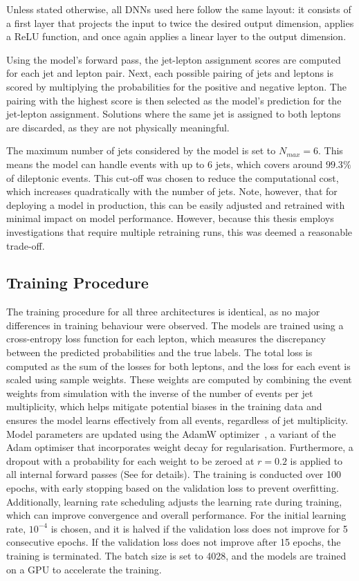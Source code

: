 Unless stated otherwise, all DNNs used here follow the same layout: it consists of a first layer that projects the input to twice the desired output dimension, applies a ReLU function, and once again applies a linear layer to the output dimension.

Using the model's forward pass, the jet-lepton assignment scores are computed for each jet and lepton pair. Next, each possible pairing of jets and leptons is scored by multiplying the probabilities for the positive and negative lepton. The pairing with the highest score is then selected as the model's prediction for the jet-lepton assignment. Solutions where the same jet is assigned to both leptons are discarded, as they are not physically meaningful.

The maximum number of jets considered by the model is set to $N_{max}=6$. This means the model can handle events with up to 6 jets, which covers around $99.3\%$ of dileptonic \ttbar events. This cut-off was chosen to reduce the computational cost, which increases quadratically with the number of jets. Note, however, that for deploying a model in production, this can be easily adjusted and retrained with minimal impact on model performance. However, because this thesis employs investigations that require multiple retraining runs, this was deemed a reasonable trade-off.

\subsection{Training Procedure}
\label{sec:assignment:training-procedure}
The training procedure for all three architectures is identical, as no major differences in training behaviour were observed. The models are trained using a cross-entropy loss function for each lepton, which measures the discrepancy between the predicted probabilities and the true labels. The total loss is computed as the sum of the losses for both leptons, and the loss for each event is scaled using sample weights. These weights are computed by combining the event weights from simulation with the inverse of the number of events per jet multiplicity, which helps mitigate potential biases in the training data and ensures the model learns effectively from all events, regardless of jet multiplicity.
Model parameters are updated using the AdamW optimizer~\cite{adamW}, a variant of the Adam optimiser that incorporates weight decay for regularisation. Furthermore, a dropout with a probability for each weight to be zeroed at $r=0.2$ is applied to all internal forward passes (See  for details). The training is conducted over 100 epochs, with early stopping based on the validation loss to prevent overfitting. Additionally, learning rate scheduling adjusts the learning rate during training, which can improve convergence and overall performance.
For the initial learning rate, $10^{-4}$ is chosen, and it is halved if the validation loss does not improve for 5 consecutive epochs. If the validation loss does not improve after 15 epochs, the training is terminated. The batch size is set to 4028, and the models are trained on a GPU to accelerate the training.

